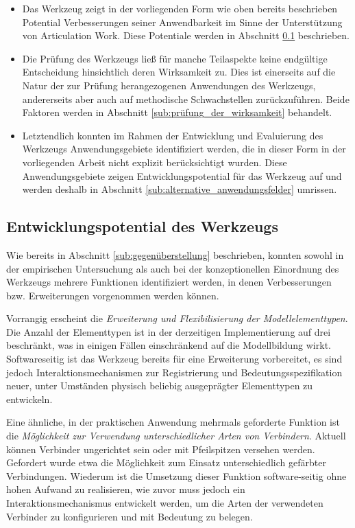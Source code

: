 \begin{itemize}
	\item Das Werkzeug zeigt in der vorliegenden Form wie oben bereits beschrieben Potential Verbesserungen seiner Anwendbarkeit im Sinne der Unterstützung von Articulation Work. Diese Potentiale werden in Abschnitt \ref{sub:entwicklungspotential_des_werkzeugs} beschrieben.
	\item Die Prüfung des Werkzeugs ließ für manche Teilaspekte keine endgültige Entscheidung hinsichtlich deren Wirksamkeit zu. Dies ist einerseits auf die Natur der zur Prüfung herangezogenen Anwendungen des Werkzeugs, andererseits aber auch auf methodische Schwachstellen zurückzuführen. Beide Faktoren werden in Abschnitt \ref{sub:prüfung_der_wirksamkeit} behandelt.
	\item Letztendlich konnten im Rahmen der Entwicklung und Evaluierung des Werkzeugs Anwendungsgebiete identifiziert werden, die in dieser Form in der vorliegenden Arbeit nicht explizit berücksichtigt wurden. Diese Anwendungsgebiete zeigen Entwicklungspotential für das Werkzeug auf und werden deshalb in Abschnitt \ref{sub:alternative_anwendungsfelder} umrissen.
\end{itemize}

\subsection{Entwicklungspotential des Werkzeugs} %
\label{sub:entwicklungspotential_des_werkzeugs}

Wie bereits in Abschnitt \ref{sub:gegenüberstellung} beschrieben, konnten sowohl in der empirischen Untersuchung als auch bei der konzeptionellen Einordnung des Werkzeugs mehrere Funktionen identifiziert werden, in denen Verbesserungen bzw. Erweiterungen vorgenommen werden können.

Vorrangig erscheint die \emph{Erweiterung und Flexibilisierung der Modellelementtypen}. Die Anzahl der Elementtypen ist in der derzeitigen Implementierung auf drei beschränkt, was in einigen Fällen einschränkend auf die Modellbildung wirkt. Softwareseitig ist das Werkzeug bereits für eine Erweiterung vorbereitet, es sind jedoch Interaktionsmechanismen zur Registrierung und Bedeutungsspezifikation neuer, unter Umständen physisch beliebig ausgeprägter Elementtypen zu entwickeln.

Eine ähnliche, in der praktischen Anwendung mehrmals geforderte Funktion ist die \emph{Möglichkeit zur Verwendung unterschiedlicher Arten von Verbindern}. Aktuell können Verbinder ungerichtet sein oder mit Pfeilspitzen versehen werden. Gefordert wurde etwa die Möglichkeit zum Einsatz unterschiedlich gefärbter Verbindungen. Wiederum ist die Umsetzung dieser Funktion software-seitig ohne hohen Aufwand zu realisieren, wie zuvor muss jedoch ein Interaktionsmechanismus entwickelt werden, um die Arten der verwendeten Verbinder zu konfigurieren und mit Bedeutung zu belegen.

